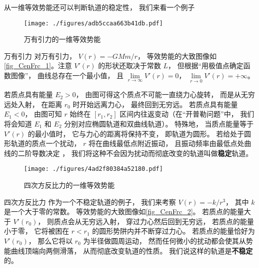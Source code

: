 从一维等效势能还可以判断轨道的稳定性， 我们来看一个例子

\begin{figure}[ht]
\centering
\texttt{[image: ./figures/adb5ccaa663b41db.pdf]}
\caption{万有引力的一维等效势能} \label{fig_CenFrc_1}
\end{figure}

\begin{example}{万有引力}
对万有引力， $V(r) = -GMm/r$， 等效势能的大致图像如\autoref{fig_CenFrc_1}。注意 $V'(r)$ 的形状还取决于常数 $L$， 但根据“用极值点确定函数图像”， 曲线总存在一个最小值， 且 $\lim\limits_{r\to\infty}V'(r) = 0$， $\lim\limits_{r\to 0} V'(r) = +\infty$。

若质点具有能量 $E_2 > 0$， 由图可得这个质点不可能一直绕力心旋转， 而是从无穷远处入射， 在距离 $r_0$ 时开始远离力心， 最终回到无穷远。 若质点具有能量 $E_1 < 0$， 由图可知 $r$ 始终在 $[r_1, r_2]$ 区间内往返变动（在“开普勒问题”中， 我们将会知道 $E_1$ 和 $E_2$ 分别对应椭圆轨道和双曲线轨道）。 特殊地， 当质点能量等于 $V'(r)$ 的最小值时， 它与力心的距离将保持不变， 即轨道为圆形。 若给处于圆形轨道的质点一个扰动， $r$ 将在曲线最低点附近振动， 且振动频率由最低点处曲线的二阶导数决定 %
， 我们将这种不会因为扰动而彻底改变的轨道叫做\textbf{稳定}轨道。
\end{example}

\begin{figure}[ht]
\centering
\texttt{[image: ./figures/4ad2f80384a52180.pdf]}
\caption{四次方反比力的一维等效势能} \label{fig_CenFrc_2}
\end{figure}

\begin{example}{四次方反比力}
作为一个不稳定轨道的例子， 我们来考察 $V(r) = -k/r^3$， 其中 $k$ 是一个大于零的常数。 等效势能的大致图像如\autoref{fig_CenFrc_2}。 若质点的能量大于 $V'(r_0)$， 则质点会从无穷远入射， 穿过力心然后回到无穷远， 若质点的能量小于零， 它将被困在 $r < r_1$ 的圆形势阱内并不断穿过力心。 若质点的能量恰好为 $V'(r_0)$， 那么它将以 $r_0$ 为半径做圆周运动， 然而任何微小的扰动都会使其从势能曲线顶端向两侧滑落， 从而彻底改变轨道的性质。 我们说这样的轨道是\textbf{不稳定}的。
\end{example}
